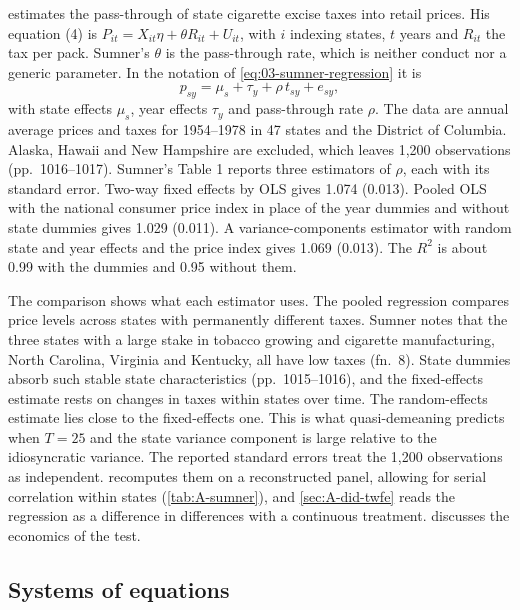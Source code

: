 \citet{Sumner1981} estimates the pass-through of state cigarette excise taxes into retail prices. His
equation (4) is $P_{it} = X_{it}\eta + \theta R_{it} + U_{it}$, with $i$ indexing states, $t$ years and
$R_{it}$ the tax per pack. Sumner's $\theta$ is the pass-through rate, which is neither conduct nor a generic
parameter. In the notation of \cref{eq:03-sumner-regression} it is
\begin{equation}\label{eq:A-sumner}
p_{sy} = \mu_s + \tau_y + \rho\,t_{sy} + e_{sy} ,
\end{equation}
with state effects $\mu_s$, year effects $\tau_y$ and pass-through rate $\rho$. The data are annual average
prices and taxes for 1954--1978 in 47 states and the District of Columbia. Alaska, Hawaii and New Hampshire
are excluded, which leaves 1,200 observations (pp.~1016--1017). Sumner's Table 1 reports three estimators of
$\rho$, each with its standard error. Two-way fixed effects by OLS gives 1.074 (0.013). Pooled OLS with the
national consumer price index in place of the year dummies and without state dummies gives 1.029 (0.011). A
variance-components estimator with random state and year effects \citep{FullerBattese1974} and the price index
gives 1.069 (0.013). The $R^2$ is about 0.99 with the dummies and 0.95 without them.

The comparison shows what each estimator uses. The pooled regression compares price levels across states
with permanently different taxes. Sumner notes that the three states with a large stake in tobacco growing
and cigarette manufacturing, North Carolina, Virginia and Kentucky, all have low taxes (fn.~8). State
dummies absorb such stable state characteristics (pp.~1015--1016), and the fixed-effects estimate rests on
changes in taxes within states over time. The random-effects estimate lies close to the fixed-effects one.
This is what quasi-demeaning predicts when $T = 25$ and the state variance component is large relative to
the idiosyncratic variance. The reported standard errors treat the 1,200 observations as independent.
 recomputes them on a reconstructed panel, allowing for serial correlation within states
(\cref{tab:A-sumner}), and \cref{sec:A-did-twfe} reads the regression as a difference in differences with a
continuous treatment.  discusses the economics of the test.

\subsection{Systems of equations}\label{sec:A-systems}

